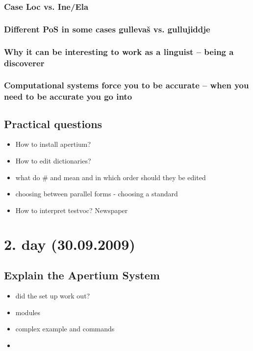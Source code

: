\documentclass[a4paper,english,12pt]{article}
\begin{document}
\subsubsection{Case Loc vs. Ine/Ela}
\subsubsection{Different PoS in some cases gullevaš vs. gullujiddje}
\subsubsection{Why it can be interesting to work as a linguist -- being a discoverer}
\subsubsection{Computational systems force you to be accurate -- when you need to be accurate you go into} 



\subsection{Practical questions}

\begin{itemize}
\item How to install apertium?
\item    How to edit dictionaries?
\item what do \# \* \@ and \/ mean and in which order should they be edited
\item choosing between parallel forms - choosing a standard
\item    How to interpret testvoc? Newspaper
\end{itemize}


\section{2. day (30.09.2009)}

\subsection{Explain the Apertium System}

\begin{itemize}
\item did the set up work out?
\item modules
\item complex example and commands
\item
\end{itemize}
\end{document}
